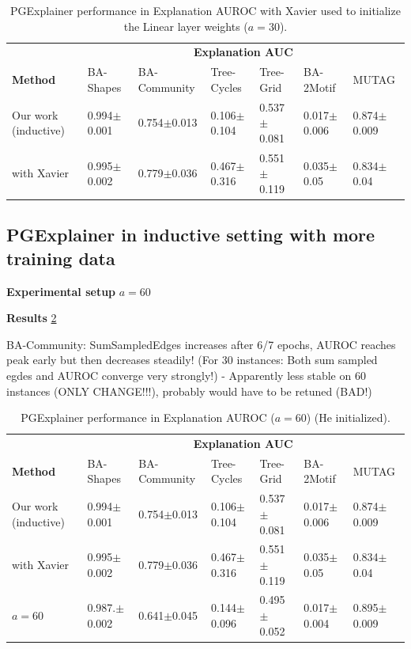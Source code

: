 \begin{table}[ht]
    \centering
    \scriptsize
    \begin{tabularx}{\textwidth}{l*{6}{X}}   %
    \toprule
    \textbf{} & \multicolumn{6}{c}{\textbf{Explanation AUC}} \\
    \cmidrule{2-7}
    \textbf{Method} & BA-Shapes & BA-Community & Tree-Cycles & Tree-Grid & BA-2Motif & MUTAG \\
    \midrule
    Our work (inductive) & 0.994$\pm$0.001 & 0.754$\pm$0.013 & 0.106$\pm$0.104 & 0.537$\pm$0.081 & 0.017$\pm$0.006 & 0.874$\pm$0.009 \\
    \midrule
    with Xavier & 0.995$\pm$0.002 & 0.779$\pm$0.036 & 0.467$\pm$0.316 & 0.551$\pm$0.119 & 0.035$\pm$0.05 & 0.834$\pm$0.04 \\
    \bottomrule
    \end{tabularx}
    \caption[Inductive performance with Xavier]{PGExplainer performance in Explanation AUROC with Xavier used to initialize the Linear layer weights ($a=30$).}
    \label{tab:pgexplainer_ind_Xavier}
\end{table}


\subsection{PGExplainer in inductive setting with more training data}

\textbf{Experimental setup}
$a=60$

\textbf{Results}
\ref{tab:experiment_60train}

BA-Community: SumSampledEdges increases after 6/7 epochs, AUROC reaches peak early but then decreases steadily! (For 30 instances: Both sum sampled egdes and AUROC converge very strongly!) - Apparently less stable on 60 instances (ONLY CHANGE!!!), probably would have to be retuned (BAD!)
\begin{table}[ht]
    \centering
    \scriptsize
    \begin{tabularx}{\textwidth}{l*{6}{X}}   %
    \toprule
    \textbf{} & \multicolumn{6}{c}{\textbf{Explanation AUC}} \\
    \cmidrule{2-7}
    \textbf{Method} & BA-Shapes & BA-Community & Tree-Cycles & Tree-Grid & BA-2Motif & MUTAG \\
    \midrule
    Our work (inductive) & 0.994$\pm$0.001 & 0.754$\pm$0.013 & 0.106$\pm$0.104 & 0.537$\pm$0.081 & 0.017$\pm$0.006 & 0.874$\pm$0.009 \\
    \midrule
    with Xavier & 0.995$\pm$0.002 & 0.779$\pm$0.036 & 0.467$\pm$0.316 & 0.551$\pm$0.119 & 0.035$\pm$0.05 & 0.834$\pm$0.04 \\
    \midrule
    $a=60$ & 0.987.$\pm$0.002 & 0.641$\pm$0.045 & 0.144$\pm$0.096 & 0.495$\pm$0.052 & 0.017$\pm$0.004 & 0.895$\pm$0.009 \\
    \bottomrule
    \end{tabularx}
    \caption[Inductive performance with 60 training instances]{PGExplainer performance in Explanation AUROC ($a=60$) (He initialized).}
    \label{tab:experiment_60train}
\end{table}


